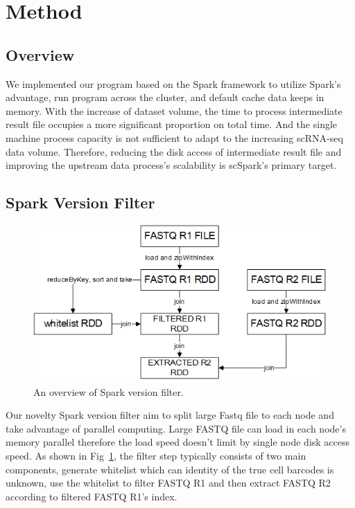 \documentclass[runningheads]{llncs}
\begin{document}
\section{Method}
\subsection{Overview}
We implemented our program based on the Spark framework to utilize Spark's advantage, run program across the cluster, and default cache data keeps in memory.
With the increase of dataset volume, the time to process intermediate result file occupies a more significant proportion on total time.
And the single machine process capacity is not sufficient to adapt to the increasing scRNA-seq data volume.
Therefore, reducing the disk access of intermediate result file and improving the upstream data process's scalability is scSpark's primary target.

\subsection{Spark Version Filter}
\begin{figure}
  \includegraphics[width=\textwidth]{fig1.png}
  \caption{An overview of Spark version filter.} \label{fig1}
\end{figure}  
Our novelty Spark version filter aim to split large Fastq file to each node and take advantage of parallel computing.
Large FASTQ file can load in each node's memory parallel therefore the load speed doesn't limit by single node disk access speed.
As shown in Fig~\ref{fig1}, the filter step typically consists of two main components, generate whitelist which can identity of the true cell barcodes is unknown, use the whitelist to filter FASTQ R1 and then extract FASTQ R2 according to filtered FASTQ R1's index.
\end{document}
